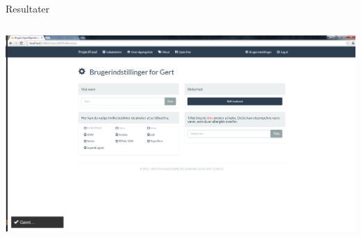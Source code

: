 \begin{frame}{Resultater}
\begin{minipage}[0.3\textheight]{\textwidth}
\begin{columns}[T]
\begin{column}{0.5\textwidth}
	 \vspace{2 mm}
	  
	  \includegraphics[width=1\textwidth,height=1\textheight,keepaspectratio, trim={1cm 0 0 16mm}, clip]{images/Screenshots/Settings.png}
	\end{column}
	\end{columns}
	

  \end{minipage}
	
\end{frame}

